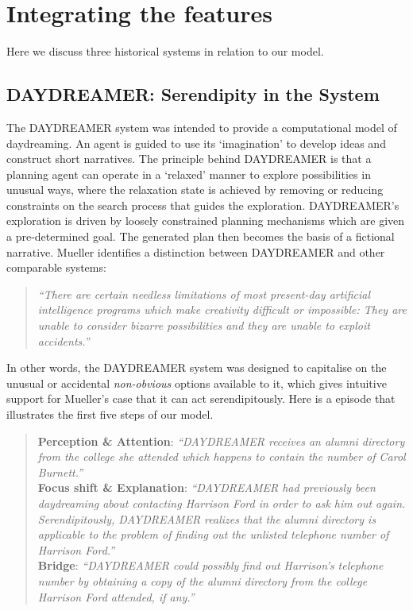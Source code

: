 \section{Integrating the features}\label{sec:system-analysis}

Here we discuss three historical systems in relation to our model. 

\subsection{{\sf DAYDREAMER}: Serendipity in the System}
The {\sf DAYDREAMER} system \cite{mueller1990} was intended to provide a computational model of daydreaming.  An agent is guided to use its `imagination' to develop ideas and construct short narratives.  The principle behind {\sf DAYDREAMER} is that a planning agent can operate in a `relaxed' manner to explore possibilities in unusual ways, where the relaxation state is achieved by removing or reducing constraints on the search process that guides the exploration.  {\sf DAYDREAMER}'s exploration is driven by loosely constrained planning mechanisms which are given a pre-determined goal.
The generated plan then becomes the basis of a fictional narrative.
Mueller identifies a distinction between {\sf DAYDREAMER} and other comparable systems:
\begin{quote}
\emph{``There are certain needless limitations of most present-day
  artificial intelligence programs which make creativity difficult or
  impossible: They are unable to consider bizarre possibilities and
  they are unable to exploit accidents.''} \cite[p. 14]{mueller1990}
\end{quote}
In other words, the {\sf DAYDREAMER} system was designed to capitalise
on the unusual or accidental {\em non-obvious} options available to
it, which gives intuitive support for Mueller's case that it can act
serendipitously.
Here is a episode that illustrates the first five steps of our model.
\begin{quote}
\textbf{Perception \& Attention}: \emph{``DAYDREAMER receives an alumni directory from the college she attended which happens to contain the number of Carol Burnett.''}\\
\textbf{Focus shift \& Explanation}: \emph{``DAYDREAMER had previously been daydreaming about contacting Harrison Ford in order to ask him out again. Serendipitously, DAYDREAMER realizes that the alumni directory is applicable to the problem of finding out the unlisted telephone number of Harrison Ford.''}\\
  \textbf{Bridge}: \emph{``DAYDREAMER could possibly find out Harrison's telephone number by obtaining a copy of the alumni directory from the college Harrison Ford attended, if any.''} \cite[p. 125]{mueller1990}
\end{quote}

